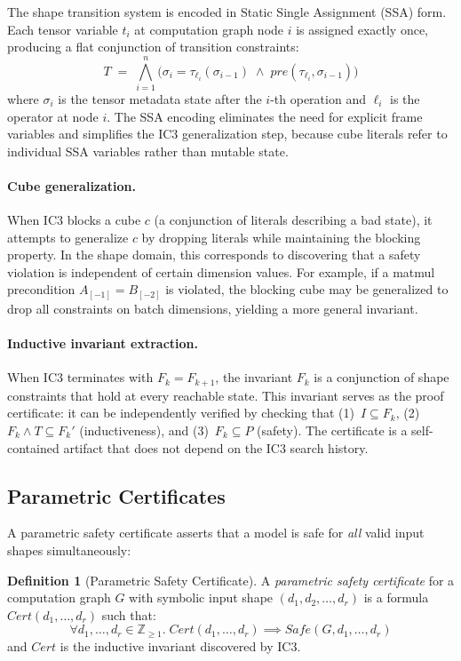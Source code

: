 \documentclass[10pt]{article}
\theoremstyle{plain}
\theoremstyle{definition}
\newtheorem{definition}[theorem]{Definition}
\theoremstyle{remark}
\begin{document}
The shape transition system is encoded in Static Single Assignment
(SSA) form.  Each tensor variable $t_i$ at computation graph node $i$
is assigned exactly once, producing a flat conjunction of transition
constraints:
\[
  T \;=\; \bigwedge_{i=1}^{n} \big(
    \sigma_{i} = \tau_{\ell_i}(\sigma_{i-1})
    \;\land\;
    \mathit{pre}(\tau_{\ell_i}, \sigma_{i-1})
  \big)
\]
where $\sigma_i$ is the tensor metadata state after the $i$-th
operation and $\ell_i$ is the operator at node $i$.  The SSA
encoding eliminates the need for explicit frame variables and
simplifies the IC3 generalization step, because cube literals
refer to individual SSA variables rather than mutable state.

\paragraph{Cube generalization.}
When IC3 blocks a cube $c$ (a conjunction of literals describing
a bad state), it attempts to generalize $c$ by dropping literals
while maintaining the blocking property.  In the shape domain,
this corresponds to discovering that a safety violation is
independent of certain dimension values.  For example, if a
matmul precondition $A_{[-1]} = B_{[-2]}$ is violated, the blocking
cube may be generalized to drop all constraints on batch dimensions,
yielding a more general invariant.

\paragraph{Inductive invariant extraction.}
When IC3 terminates with $F_k = F_{k+1}$, the invariant $F_k$ is
a conjunction of shape constraints that hold at every reachable
state.  This invariant serves as the proof certificate: it can be
independently verified by checking that (1)~$I \subseteq F_k$,
(2)~$F_k \land T \subseteq F_k'$ (inductiveness), and
(3)~$F_k \subseteq P$ (safety).  The certificate is a
self-contained artifact that does not depend on the IC3 search
history.

\subsection{Parametric Certificates}\label{sec:param-cert}

A parametric safety certificate asserts that a model is safe for
\emph{all} valid input shapes simultaneously:

\begin{definition}[Parametric Safety Certificate]
A \emph{parametric safety certificate} for a computation graph $G$
with symbolic input shape $(d_1, d_2, \ldots, d_r)$ is a formula
$\mathit{Cert}(d_1, \ldots, d_r)$ such that:
\[
  \forall d_1, \ldots, d_r \in \mathbb{Z}_{\geq 1}.\;
  \mathit{Cert}(d_1, \ldots, d_r) \implies \mathit{Safe}(G, d_1, \ldots, d_r)
\]
and $\mathit{Cert}$ is the inductive invariant discovered by IC3.
\end{definition}
\end{document}
